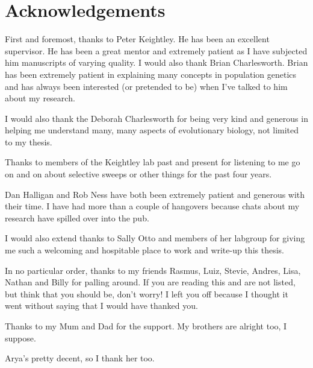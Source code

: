 \chapter*{Acknowledgements}

First and foremost, thanks to Peter Keightley. He has been an excellent supervisor. He has been a great mentor and extremely patient as I have subjected him manuscripts of varying quality. I would also thank Brian Charlesworth. Brian has been extremely patient in explaining many concepts in population genetics and has always been interested (or pretended to be) when I've talked to him about my research.

I would also thank the Deborah Charlesworth for being very kind and generous in helping me understand many, many aspects of evolutionary biology, not limited to my thesis.

Thanks to members of the Keightley lab past and present for listening to me go on and on about selective sweeps or other things for the past four years.

Dan Halligan and Rob Ness have both been extremely patient and generous with their time. I have had more than a couple of hangovers because chats about my research have spilled over into the pub.

I would also extend thanks to Sally Otto and members of her labgroup for giving me such a welcoming and hospitable place to work and write-up this thesis.

In no particular order, thanks to my friends Rasmus, Luiz, Stevie, Andres, Lisa, Nathan and Billy for palling around. If you are reading this and are not listed, but think that you should be, don't worry! I left you off because I thought it went without saying that I would have thanked you.

Thanks to my Mum and Dad for the support. My brothers are alright too, I suppose.

Arya's pretty decent, so I thank her too.